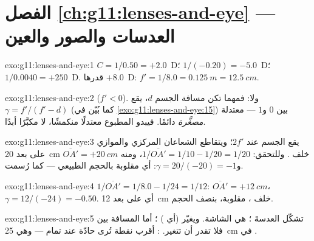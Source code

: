 \section*{الفصل \ref{ch:g11:lenses-and-eye} --- العدسات والصور والعين}

\begin{solution}{exo:g11:lenses-and-eye:1}
$C = 1/0.50 = +2.0$~D؛ $1/(-0.20) = -5.0$~D؛ $1/0.0040 = +250$~D.
 قدرها $+8.0$~D: $f' = 1/8.0 = \qty{0.125}{m} = \qty{12.5}{cm}$.
\end{solution}

\begin{solution}{exo:g11:lenses-and-eye:2}
 ($f' < 0$). ولا: فمهما تكن مسافة الجسم $d$،
يقع $\gamma = f'/(f' - d)$ (كما بُيّن في \cref{exo:g11:lenses-and-eye:15})
بين $0$ و$1$ ---  معتدلة \emph{مصغَّرة} دائمًا. فيبدو المطبوع معتدلًا
منكمشًا، لا مكبَّرًا أبدًا.
\end{solution}

\begin{solution}{exo:g11:lenses-and-eye:3}
يقع الجسم عند $2f'$؛ ويتقاطع الشعاعان المركزي والموازي
على بعد \qty{20}{cm} خلف . وللتحقق:
$1/\overline{OA'} = 1/10 - 1/20 = 1/20$، ومنه
$\overline{OA'} = +\qty{20}{cm}$ و$\gamma = 20/(-20) = -1$: أي 
مقلوبة بالحجم الطبيعي --- كما رُسمت.
\end{solution}

\begin{solution}{exo:g11:lenses-and-eye:4}
$1/\overline{OA'} = 1/8.0 - 1/24 = 1/12$:
$\overline{OA'} = +\qty{12}{cm}$، $\gamma = 12/(-24) = -0.50$. أي  على بعد \qty{12}{cm} خلف ، مقلوبة، بنصف الحجم.
\end{solution}

\begin{solution}{exo:g11:lenses-and-eye:5}
تشكّل   العدسةَ ؛  هي
الشاشة. ويغيّر   (أي )
؛ أما المسافة بين   فلا تقدر أن تتغير. : أقرب نقطة تُرى حادّة عند تمام  ---
وهي \qty{25}{cm} في .
\end{solution}

